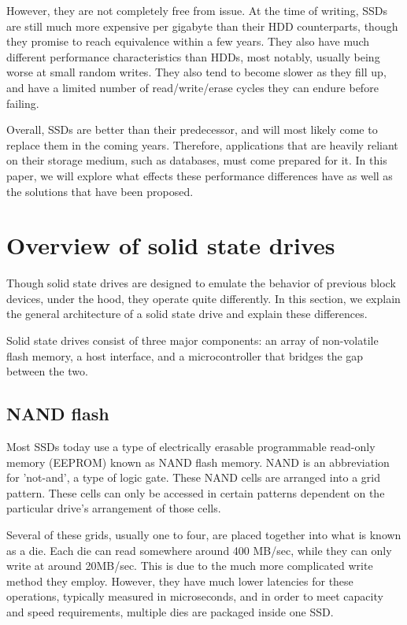 \documentclass[format=acmsmall, review=false, screen=true]{acmart}
\begin{document}
However, they are not completely free from issue. At the time of writing, SSDs are still much more expensive per gigabyte 
than their HDD counterparts, though they promise to reach equivalence within a few years. They also have much different 
performance characteristics than HDDs, most notably, usually being worse at small random writes. They also tend to become 
slower as they fill up, and have a limited number of read/write/erase cycles they can endure before failing. 
\cite{Xie2011, Dumitru2007}

Overall, SSDs are better than their predecessor, and will most likely come to replace them in the coming years. Therefore, 
applications that are heavily reliant on their storage medium, such as databases, must come prepared for it. In this paper, 
we will explore what effects these performance differences have as well as the solutions that have been proposed.

\section{Overview of solid state drives}

Though solid state drives are designed to emulate the behavior of previous block devices, under the hood, they operate 
quite differently. \cite{Lee2008, Cornwell2012, Micheloni2013, MatejFucek2014} In this section, we explain the general 
architecture of a solid state drive and explain these differences.

Solid state drives consist of three major components: an array of non-volatile flash memory, a host interface, and a 
microcontroller that bridges the gap between the two. 

\subsection{NAND flash}

Most SSDs today use a type of electrically erasable programmable read-only memory (EEPROM) known as NAND flash memory. 
NAND is an abbreviation for 'not-and', a type of logic gate. These NAND cells are arranged into a grid pattern. These 
cells can only be accessed in certain patterns dependent on the particular drive's arrangement of those cells. 
\cite{Cornwell2012, Micheloni2013}

Several of these grids, usually one to four, are placed together into what is known as a die. Each die can read somewhere 
around 400 MB/sec, while they can only write at around 20MB/sec. This is due to the much more complicated write method 
they employ. However, they have much lower latencies for these operations, typically measured in microseconds, and in 
order to meet capacity and speed requirements, multiple dies are packaged inside one SSD. \cite{Cornwell2012, Micheloni2013}
\end{document}
